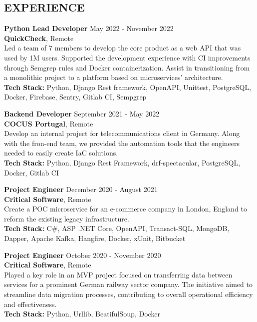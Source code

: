 \documentclass[margin, 10pt]{res} %
\begin{document}
\begin{resume}
    \section{EXPERIENCE}

    \textbf{Python Lead Developer} \hfill May 2022 - November 2022\\
    \textbf{QuickCheck}, Remote\\
    Led a team of 7 members to develop the core product as a web API that was used by 1M users. Supported the development experience with CI improvements through Semgrep rules and Docker containerization. Assist in transitioning from a monolithic project to a platform based on microservices' architecture.\\
    \textbf {Tech Stack:} Python, Django Rest framework, OpenAPI, Unittest, PostgreSQL, Docker, Firebase, Sentry, Gitlab CI, Sempgrep


    \textbf{Backend Developer} \hfill September 2021 - May 2022\\
    \textbf{COCUS Portugal}, Remote\\
    Develop an internal project for telecommunications client in Germany. Along with the fron-end team, we provided the automation tools that the engineers needed to easily create IaC solutions.\\
    \textbf {Tech Stack:} Python, Django Rest Framework, drf-spectacular, PostgreSQL, Docker, Gitlab CI


    \textbf{Project Engineer} \hfill December 2020 - August 2021\\
    \textbf{Critical Software}, Remote\\
    Create a POC microservice for an e-commerce company in London, England to reform the existing legacy infrastructure.\\
    \textbf {Tech Stack:} C\#, ASP .NET Core, OpenAPI, Transact-SQL, MongoDB, Dapper, Apache Kafka, Hangfire, Docker, xUnit, Bitbucket


    \textbf{Project Engineer} \hfill October 2020 - November 2020\\
    \textbf{Critical Software}, Remote\\
    Played a key role in an MVP project focused on transferring data between services for a prominent German railway sector company. The initiative aimed to streamline data migration processes, contributing to overall operational efficiency and effectiveness.\\
    \textbf {Tech Stack:} Python, Urllib, BeatifulSoup, Docker



\end{resume}
\end{document}
